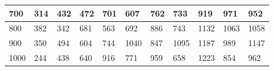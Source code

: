 \documentclass[10pt,letterpaper]{article}
\begin{document}
\begin{center}
\begin{table}
\begin{tabular} { |m{0.5cm}|m{1.3cm}|m{1.3cm}|m{1.3cm}|m{1.3cm}|m{1.3cm}|m{1.3cm}|m{1.3cm}|m{1.3cm}|m{1.3cm}|m{1.3cm}|}
\hline
\cellcolor{Gray}700 & \Large 314 & \Large 432 & \Large 472 & \Large 701 & \Large 607 & \Large 762 & \Large 733 & \Large 919 & \Large 971 & \Large 952 \\
\hline
\cellcolor{Gray}800 & \Large 382 & \Large 342 & \Large 681 & \Large 563 & \Large 692 & \Large 886 & \Large 743 & \Large 1132 & \Large 1063 & \Large 1058 \\
\hline
\cellcolor{Gray}900 & \Large 350 & \Large 494 & \Large 604 & \Large 744 & \Large 1040 & \Large 847 & \Large 1095 & \Large 1187 & \Large 989 & \Large 1147 \\
\hline
\cellcolor{Gray}1000 & \Large 244 & \Large 438 & \Large 640 & \Large 916 & \Large 771 & \Large 959 & \Large 658 & \Large 1223 & \Large 854 & \Large 962 \\
\hline
\end{tabular} \\
\end{table}
\end{center}
\newpage 
{}
\end{document}
